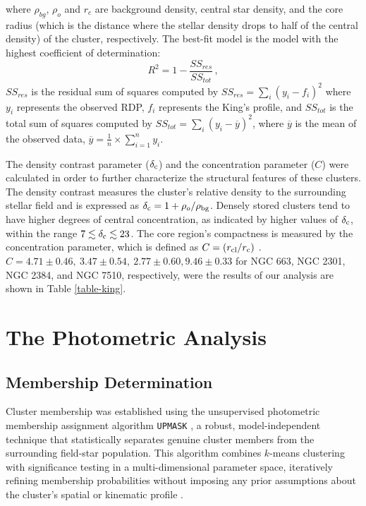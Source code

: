 \documentclass[referee]{raa}            %
\begin{document}
where $\rho_{bg}$, $\rho_o$ and $r_c$ are background density, central star density, and the core radius (which is the distance where the stellar density drops to half of the central density) of the cluster, respectively. The best-fit model is the model with the highest coefficient of determination:
\begin{equation}
R^2=1-\frac{SS_{res}}{SS_{tot}}\,,
\end{equation}
$SS_{res}$ is the residual sum of squares computed by $SS_{res}=\sum_i(y_i-f_i)^2$ where $y_i$ represents the observed RDP, $f_i$ represents the King's profile, and $SS_{tot}$ is the total sum of squares computed by $SS_{tot}=\sum_i(y_i-\overline{y})^2$, where $\overline{y}$ is the mean of the observed data, $\overline{y}=\frac{1}{n}\times\sum_{i=1}^n y_i$.

The density contrast parameter ($\delta_{\rm c}$) and the concentration parameter ($C$) were calculated in order to further characterize the structural features of these clusters.  The density contrast measures the cluster's relative density to the surrounding stellar field and is expressed as $\delta_{\rm c} = 1 + \rho_o / \rho_{\rm bg}$.  Densely stored clusters tend to have higher degrees of central concentration, as indicated by higher values of $\delta_{\rm c}$, within the range $7 \lesssim \delta_{\rm c} \lesssim 23$. The core region's compactness is measured by the concentration parameter, which is defined as $C = (r_{\rm cl}/r_{\rm c})$ \citep{king1966}. $C = 4.71\pm0.46,~3.47\pm0.54,~2.77\pm0.60, 9.46\pm0.33$ for NGC 663, NGC 2301, NGC 2384, and NGC 7510, respectively, were the results of our analysis are shown in Table \ref{table-king}.
 
\section{The Photometric Analysis}

\subsection{Membership Determination}
\label{section:membership}

Cluster membership was established using the unsupervised photometric membership assignment algorithm \texttt{UPMASK} \citep{Krone-Martins_2014}, a robust, model-independent technique that statistically separates genuine cluster members from the surrounding field-star population. This algorithm combines $k$-means clustering with significance testing in a multi-dimensional parameter space, iteratively refining membership probabilities without imposing any prior assumptions about the cluster’s spatial or kinematic profile \citep{Yontan2022, TasdemirCinar_2025}.
\end{document}
